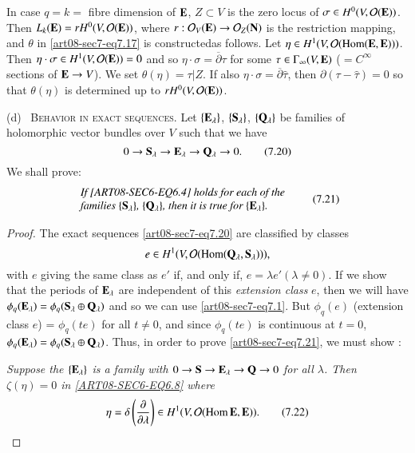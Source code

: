 \begin{remark*}
In case $q=k=$ fibre dimension of $\mathbf{E}$, $Z\subset V$ is the zero locus of $\sigma\in H^{0}(V,\mathcal{O}(\mathbf{E}))$. Then $L_{k}(\mathbf{E})=rH^{0}(V,\mathcal{O}(\mathbf{E}))$, where $r:\mathcal{O}_{V}(\mathbf{E})\to \mathcal{O}_{Z}(\mathbf{N})$ is the restriction mapping, and $\theta$ in \eqref{art08-sec7-eq7.17} is constructed\pageoriginale as follows. Let $\eta\in H^{1}(V,\mathcal{O}(\operatorname{\mathrm{Hom}}(\mathbf{E},\mathbf{E})))$. Then $\eta\cdot \sigma \in H^{1}(V,\mathcal{O}(\mathbf{E}))=0$ and so $\eta\cdot \sigma=\overline{\partial}\tau$ for some $\tau\in \Gamma_{\infty}(V,\mathbf{E})$ ($=C^{\infty}$ sections of $\mathbf{E}\to V$). We set $\theta(\eta)=\tau|Z$. If also $\eta\cdot \sigma=\overline{\partial}\widehat{\tau}$, then $\partial(\tau-\widehat{\tau})=0$ so that $\theta(\eta)$ is determined up to $rH^{0}(V,\mathcal{O}(\mathbf{E}))$.
\end{remark*}

(d)~ \textsc{Behavior in exact sequences.} Let $\{\mathbf{E}_{\lambda}\}$, $\{\mathbf{S}_{\lambda}\}$, $\{\mathbf{Q}_{\lambda}\}$ be families of holomorphic vector bundles over $V$ such that we have 
\begin{equation*}
0\to \mathbf{S}_{\lambda} \to \mathbf{E}_{\lambda}\to \mathbf{Q}_{\lambda}\to 0.\tag{7.20}\label{art08-sec7-eq7.20}
\end{equation*}
We shall prove:
\begin{equation*}
\begin{array}{l}
\text{\em If \eqref{ART08-SEC6-EQ6.4} holds for each of the}\\
\text{\em families $\{\mathbf{S}_{\lambda}\}$, $\{\mathbf{Q}_{\lambda}\}$, then it is true for $\{\mathbf{E}_{\lambda}\}$.}
\end{array}\tag{7.21}\label{art08-sec7-eq7.21}
\end{equation*}

\begin{proof}
The exact sequences \eqref{art08-sec7-eq7.20} are classified by classes 
$$
e\in H^{1}(V,\mathcal{O}(\operatorname{\mathrm{Hom}}(\mathbf{Q}_{\lambda},\mathbf{S}_{\lambda}))),
$$ 
with $e$ giving the same class as $e'$ if, and only if, $e=\lambda e'(\lambda\neq 0)$. If we show that the periods of $\mathbf{E}_{\lambda}$ are independent of this {\em extension class} $e$, then we will have $\phi_{q}(\mathbf{E}_{\lambda})=\phi_{q}(\mathbf{S}_{\lambda}\oplus \mathbf{Q}_{\lambda})$ and so we can use \eqref{art08-sec7-eq7.1}. But $\phi_{q}(e)$ (extension class $e$) = $\phi_{q}(te)$ for all $t\neq 0$, and since $\phi_{q}(te)$ is continuous at $t=0$, $\phi_{q}(\mathbf{E}_{\lambda})=\phi_{q}(\mathbf{S}_{\lambda}\oplus\mathbf{Q}_{\lambda})$. Thus, in order to prove \eqref{art08-sec7-eq7.21}, we must show :

{\em Suppose the $\{\mathbf{E}_{\lambda}\}$ is a family with $0\to \mathbf{S}\to \mathbf{E}_{\lambda}\to \mathbf{Q}\to 0$ for all $\lambda$. Then $\zeta(\eta)=0$ in \eqref{ART08-SEC6-EQ6.8} where}
\begin{equation*}
\eta=\delta \left(\dfrac{\partial}{\partial\lambda}\right)\in H^{1}(V,\mathcal{O}(\operatorname{\mathrm{Hom}} \mathbf{E},\mathbf{E})).\tag{7.22}\label{art08-sec7-eq7.22}
\end{equation*}
\end{proof}

